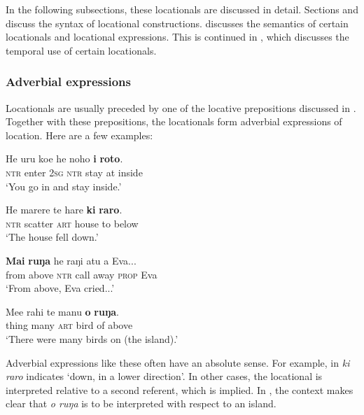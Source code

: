 In the following subsections, these locationals are discussed in detail. Sections  and  discuss the syntax of locational constructions.  discusses the semantics of certain locationals and locational expressions. This is continued in , which discusses the temporal use of certain locationals.




\subsubsection[Adverbial expressions]{Adverbial expressions}\label{sec:3.6.2.1}

Locationals are usually preceded by one of the locative prepositions discussed in . Together with these prepositions, the locationals form adverbial expressions of location. Here are a few examples:

\ea\label{ex:3.129}
\gll He uru koe he noho \textbf{{\ꞌ}i} \textbf{roto}. \\
\textsc{ntr} enter \textsc{2sg} \textsc{ntr} stay at inside \\

\glt 
‘You go in and stay inside.’ \textstyleExampleref{[R310.295]} 
\z

\ea\label{ex:3.130}
\gll He marere te hare \textbf{ki} \textbf{raro}. \\
\textsc{ntr} scatter \textsc{art} house to below \\

\glt 
‘The house fell down.’ \textstyleExampleref{[Ley-2-12.006]}
\z

\ea\label{ex:3.131}
\gll \textbf{Mai} \textbf{ruŋa} he raŋi atu a Eva... \\
from above \textsc{ntr} call away \textsc{prop} Eva \\

\glt 
‘From above, Eva cried...’ \textstyleExampleref{[R210.111]} 
\z

\ea\label{ex:3.132}
\gll Me{\ꞌ}e rahi te manu \textbf{o} \textbf{ruŋa}. \\
thing many \textsc{art} bird of above \\

\glt
‘There were many birds on (the island).’ \textstyleExampleref{[Egt-02.083]}
\z

Adverbial expressions like these often have an absolute sense. For example, in  \textit{ki raro} indicates ‘down, in a lower direction’. In other cases, the locational is interpreted relative to a second referent, which is implied. In , the context makes clear that \textit{o ruŋa} is to be interpreted with respect to an island.

